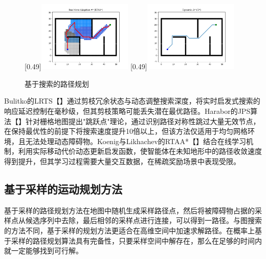 \documentclass[master,academic]{ysuthesis} %
\begin{document}
\begin{figure}[!ht]
			[0.49\textwidth]{\includegraphics[width=0.4\textwidth]{插图/A-search/RTAAstar.png}}
			[0.49\textwidth]{\includegraphics[width=0.4\textwidth]{插图/A-search/Dstar.png}}
			\caption{基于搜索的路径规划}
			\label{fig:基于搜索的路径规划}
		\end{figure}

		Bulitko的LRTS【】通过剪枝冗余状态与动态调整搜索深度，将实时启发式搜索的响应延迟控制在毫秒级，但其剪枝策略可能丢失潜在最优路径。Harabor的JPS算法【】针对栅格地图提出"跳跃点"理论，通过识别路径对称性跳过大量无效节点，在保持最优性的前提下将搜索速度提升10倍以上，但该方法仅适用于均匀网格环境，且无法处理动态障碍物。Koenig与Likhachev的RTAA*【】结合在线学习机制，利用实际移动代价动态更新启发函数，使智能体在未知地形中的路径收敛速度得到提升，但其学习过程需要大量交互数据，在稀疏奖励场景中表现受限。

		\subsection{基于采样的运动规划方法}
		基于采样的路径规划方法在地图中随机生成采样路径点，然后将被障碍物占据的采样点从候选序列中去除，最后相邻的采样点进行连接，可以得到一路径。与图搜索的方法不同，基于采样的规划方法更适合在高维空间中加速求解路径。在概率上基于采样的路径规划算法具有完备性，只要采样空间中解存在，那么在足够的时间内就一定能够找到可行解。
\end{document}

